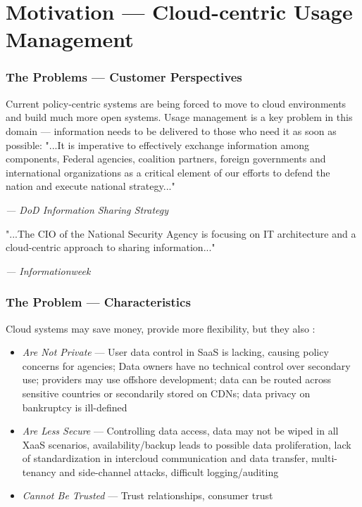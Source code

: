\section{Motivation --- Cloud-centric Usage Management}


\begin{frame}[t]
\frametitle{The Problems --- Customer Perspectives}
Current policy-centric systems are being forced to move to cloud environments and build much more open systems.  Usage management is a key problem in this domain --- information needs to be delivered to those who need it as soon as possible:
\newline
\newline
"...It is imperative to  effectively exchange information among components, Federal agencies, coalition partners, foreign governments and international organizations as a critical element of our efforts to defend the nation and execute national strategy..."\cite{proposal:info-sharing-strategy}
\newline
\begin{footnotesize}\textit{--- DoD Information Sharing Strategy}\end{footnotesize}
\newline
\newline
"...The CIO of the National Security Agency is focusing on IT architecture and a cloud-centric approach to sharing information..."\cite{proposal:nsa-cloud}
\newline
\begin{footnotesize}\textit{--- Informationweek}\end{footnotesize}
\end{frame}

\begin{frame}[t]
\frametitle{The Problem --- Characteristics}
Cloud systems may save money, provide more flexibility, but they also \cite{proposal:privacy-security-trust-cloud}:
\begin{itemize}
\item<2-> \textit{Are Not Private} --- User data control in SaaS is lacking, causing policy concerns for agencies; Data owners have no technical control over secondary use; providers may use offshore development; data can be routed across sensitive countries or secondarily stored on CDNs; data privacy on bankruptcy is ill-defined
\item<3-> \textit{Are Less Secure} --- Controlling data access, data may not be wiped in all XaaS scenarios, availability/backup leads to possible data proliferation, lack of standardization in intercloud communication and data transfer, multi-tenancy and side-channel attacks, difficult logging/auditing
\item<4-> \textit{Cannot Be Trusted} --- Trust relationships, consumer trust
\end{itemize}
\end{frame}

